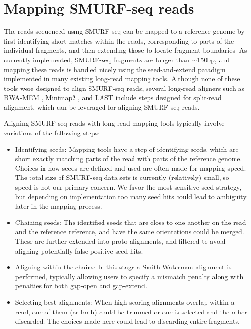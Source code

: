 \section{Mapping SMURF-seq reads}
The reads sequenced using SMURF-seq can be mapped to a reference genome
by first identifying short matches within the reads, corresponding to
parts of the individual fragments, and then extending those to locate
fragment boundaries.
%
As currently implemented, SMURF-seq fragments are longer than
$\sim$150bp, and mapping these reads is handled nicely using the
seed-and-extend paradigm implemented in many existing long-read mapping
tools.
%
Although none of these tools were designed to align SMURF-seq reads,
several long-read aligners such as BWA-MEM \citep{li2013aligning},
Minimap2 \citep{li2018minimap2}, and LAST \citep{kielbasa2011adaptive}
include steps designed for split-read alignment, which can be leveraged
for aligning SMURF-seq reads.

Aligning SMURF-seq reads with long-read mapping tools typically involve
variations of the following steps:
\begin{itemize}
\item Identifying seeds: Mapping tools have a step of identifying seeds,
  which are short exactly matching parts of the read with parts of the
  reference genome. Choices in how seeds are defined and used are often
  made for mapping speed. The total size of SMURF-seq data sets is
  currently (relatively) small, so speed is not our primary concern. We
  favor the most sensitive seed strategy, but depending on implementation
  too many seed hits could lead to ambiguity later in the mapping process.
\item Chaining seeds: The identified seeds that are close to one another
  on the read and the reference reference, and have the same orientations
  could be merged. These are further extended into proto alignments, and
  filtered to avoid aligning potentially false positive seed hits.
\item Aligning within the chains: In this stage a Smith-Waterman
  alignment is performed, typically allowing users to specify a mismatch
  penalty along with penalties for both gap-open and gap-extend.
\item Selecting best alignments: When high-scoring alignments overlap
  within a read, one of them (or both) could be trimmed or one is selected
  and the other discarded. The choices made here could lead to discarding
  entire fragments.
\end{itemize}

